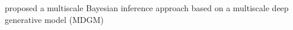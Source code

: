 \cite{Xia2022,Xu2023,Xia2023}

\cite{Xia2023} proposed a multiscale Bayesian inference approach based on a multiscale deep generative model (MDGM)
